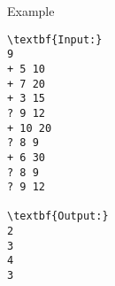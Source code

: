 Example
\begin{verbatim}
\textbf{Input:}
9
+ 5 10
+ 7 20
+ 3 15
? 9 12
+ 10 20
? 8 9
+ 6 30
? 8 9
? 9 12

\textbf{Output:}
2
3
4
3\end{verbatim}